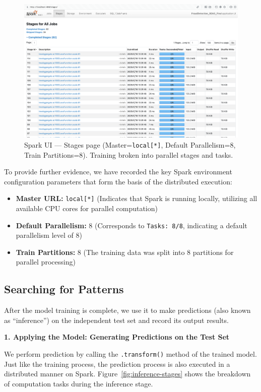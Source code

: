 \documentclass[sigplan,screen]{acmart}
\begin{document}
\begin{figure}[h]
  \centering
  \includegraphics[width=\textwidth]{Figure/7.2c.png}
  \caption{Spark UI --- Stages page (Master=\texttt{local[*]}, Default Parallelism=8, Train Partitions=8). Training broken into parallel stages and tasks.}
  \label{fig:spark-ui-stages}
\end{figure}

To provide further evidence, we have recorded the key Spark environment configuration parameters that form the basis of the distributed execution:

\begin{itemize}
\item \textbf{Master URL:} \texttt{local[*]} (Indicates that Spark is running locally, utilizing all available CPU cores for parallel computation)
\item \textbf{Default Parallelism:} 8 (Corresponds to \texttt{Tasks: 8/8}, indicating a default parallelism level of 8)
\item \textbf{Train Partitions:} 8 (The training data was split into 8 partitions for parallel processing)
\end{itemize}

\subsection{Searching for Patterns}

After the model training is complete, we use it to make predictions (also known as ``inference'') on the independent test set and record its output results.

\textbf{1. Applying the Model: Generating Predictions on the Test Set}

We perform prediction by calling the \texttt{.transform()} method of the trained model. Just like the training process, the prediction process is also executed in a distributed manner on Spark. Figure~\ref{fig:inference-stages} shows the breakdown of computation tasks during the inference stage.
\end{document}
